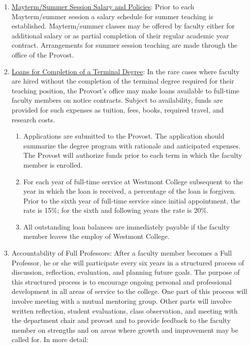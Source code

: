 \begin{enumerate}[label=\alph*)]
				\item{\underline{ Mayterm/Summer Session Salary and Policies}:  Prior to each Mayterm/summer
					session a salary schedule for summer teaching is established.  Mayterm/summer
					classes may be offered by faculty either for additional salary or as partial
					completion of their regular academic year contract. Arrangements for summer
					session teaching are made through the office of the Provost. }

				\item{\underline{ Loans for Completion of a Terminal Degree}:  In the rare
					cases where faculty are hired without the completion of the terminal degree
					required for their teaching position, the Provost's office may make loans
					available to full-time faculty members on notice contracts. Subject to
					availability, funds are provided for such expenses as tuition, fees, books,
					required travel, and research costs.

					\begin{enumerate}[label=\arabic*)]

						\item{ Applications are submitted to the Provost.  The
							application should summarize the degree program with
							rationale and anticipated expenses.  The Provost will
							authorize funds prior to each term in which the faculty
							member is enrolled. }

						\item{ For each year of full-time service at Westmont
							College subsequent to the year in which the loan is
							received, a percentage of the loan is forgiven.  Prior to
							the sixth year of full-time service since initial
							appointment, the rate is 15\%; for the sixth and following
							years the rate is 20\%. }

						\item{ All outstanding loan balances are immediately payable
							if the faculty member leaves the employ of Westmont College.}

					\end{enumerate}
				}

				\item{Accountability of Full Professors:  After a faculty member becomes a
					Full Professor, he or she will participate every six years in a structured
					process of discussion, reflection, evaluation, and planning future goals. The
					purpose of this structured process is to encourage ongoing personal and
					professional development in all areas of service to the college. One part of
					this process will involve meeting with a mutual mentoring group. Other parts
					will involve written reflection, student evaluations, class observation, and
					meeting with the department chair and provost and to provide feedback to the
					faculty member on strengths and on areas where growth and improvement may be
					called for. In more detail:

}
\end{enumerate}
